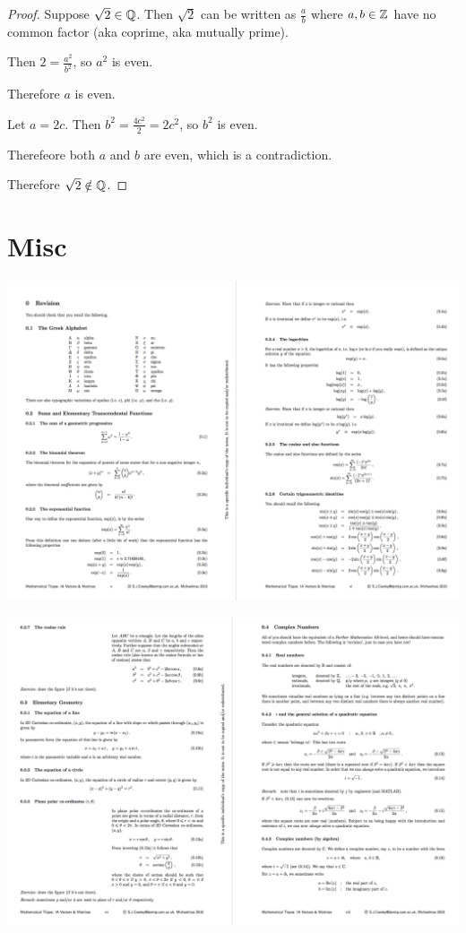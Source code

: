 \begin{proof}
  Suppose $\sqrt{2} \in \mathbb{Q}$. Then $\sqrt{2}$ can be written as $\frac{a}{b}$ where $a, b \in \mathbb{Z}$
  have no common factor (aka coprime, aka mutually prime).

  Then $2 = \frac{a^2}{b^2}$, so $a^2$ is even.

  Therefore $a$ is even.

  Let $a = 2c$. Then $b^2 = \frac{4c^2}{2} = 2c^2$, so $b^2$ is even.

  Therefeore both $a$ and $b$ are even, which is a contradiction.

  Therefore $\sqrt{2} \notin \mathbb{Q}$.
\end{proof}


\section{Misc}
\begin{mdframed}
\includegraphics[width=400pt]{img/misc--cambridge-1a-vectors-and-matrices-revision-1.png}
\end{mdframed}
\begin{mdframed}
\includegraphics[width=400pt]{img/misc--cambridge-1a-vectors-and-matrices-revision-2.png}
\end{mdframed}

